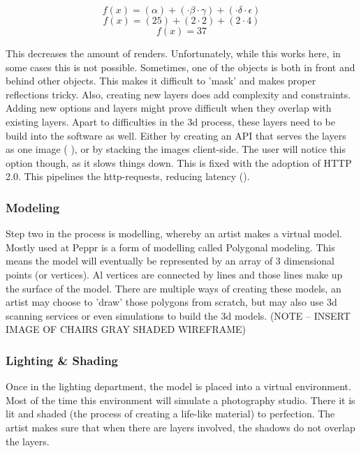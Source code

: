 \[ f(x) = (\alpha) + (\cdot \beta \cdot \gamma) + (\cdot \delta \cdot \epsilon)\]
\[ f(x) = (25) + (2 \cdot 2) + (2 \cdot 4)\]
\[ f(x) = 37\]

This decreases the amount of renders. Unfortunately, while this works here, in some cases this is not possible. Sometimes, one of the objects is both in front and behind other objects. This makes it difficult to 'mask' and makes proper reflections tricky. Also, creating new layers does add complexity and constraints. Adding new options and layers might prove difficult when they overlap with existing layers.
\newline
Apart to difficulties in the 3d process, these layers need to be build into the software as well. Either by creating an API that serves the layers as one image (\cite{bugaboo} ), or by stacking the images client-side. The user will notice this option though, as it slows things down. This is fixed with the adoption of HTTP 2.0. This pipelines the http-requests, reducing latency (\cite{latency}).

\subsubsection{Modeling}
Step two in the process is modelling, whereby an artist makes a virtual model. Mostly used at Peppr is a form of modelling called Polygonal modeling. This means the model will eventually be represented by an array of 3 dimensional points (or vertices). Al vertices are connected by lines and those lines make up the surface of the model. There are multiple ways of creating these models, an artist may choose to 'draw' those polygons from scratch, but may also use 3d scanning services or even simulations to build the 3d models.
(NOTE -- INSERT IMAGE OF CHAIRS GRAY SHADED WIREFRAME)

\subsubsection{Lighting \& Shading}
Once in the lighting department, the model is placed into a virtual environment. Most of the time this environment will simulate a photography studio. There it is lit and shaded (the process of creating a life-like material) to perfection. The artist makes sure that when there are layers involved, the shadows do not overlap the layers.

